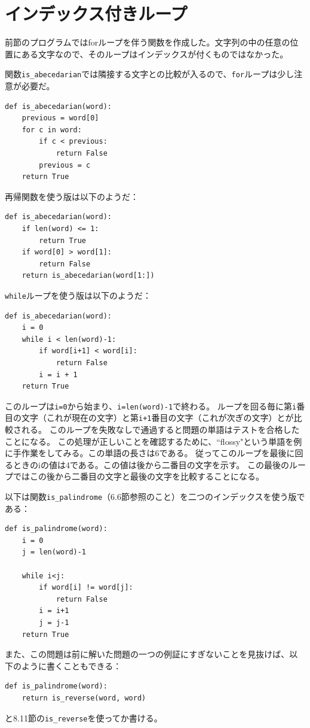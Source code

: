 \documentclass[a4j,12pt,makeidx]{jbook}
\begin{document}
\section{インデックス付きループ}
前節のプログラムではforループを伴う関数を作成した。文字列の中の任意の位置にある文字なので、そのループはインデックスが付くものではなかった。 \par
関数{\tt is\_abecedarian}では隣接する文字との比較が入るので、{\tt for}ループは少し注意が必要だ。
\begin{verbatim}
def is_abecedarian(word):
    previous = word[0]
    for c in word:
        if c < previous:
            return False
        previous = c
    return True
\end{verbatim} 
再帰関数を使う版は以下のようだ：
\begin{verbatim}
def is_abecedarian(word):
    if len(word) <= 1:
        return True
    if word[0] > word[1]:
        return False
    return is_abecedarian(word[1:])
\end{verbatim} 
{\tt while}ループを使う版は以下のようだ：
\begin{verbatim}
def is_abecedarian(word):
    i = 0
    while i < len(word)-1:
        if word[i+1] < word[i]:
            return False
        i = i + 1
    return True
\end{verbatim} 
このループは{\tt i=0}から始まり、{\tt i=len(word)-1}で終わる。
ループを回る毎に第{\tt i}番目の文字（これが現在の文字）と第{\tt i+1}番目の文字（これが次ぎの文字）とが比較される。
このループを失敗なしで通過すると問題の単語はテストを合格したことになる。
この処理が正しいことを確認するために、``flossy"という単語を例に手作業をしてみる。この単語の長さは6である。
従ってこのループを最後に回るときのiの値は4である。この値は後から二番目の文字を示す。
この最後のループではこの後から二番目の文字と最後の文字を比較することになる。\par
以下は関数{\tt is\_palindrome}（6.6節参照のこと）を二つのインデックスを使う版である：
\begin{verbatim}
def is_palindrome(word):
    i = 0
    j = len(word)-1

    while i<j:
        if word[i] != word[j]:
            return False
        i = i+1
        j = j-1
    return True
\end{verbatim}
また、この問題は前に解いた問題の一つの例証にすぎないことを見抜けば、以下のように書くこともできる：
\begin{verbatim}
def is_palindrome(word):
    return is_reverse(word, word)
\end{verbatim}
と8.11節の{\tt is\_reverse}を使ってか書ける。
%
\end{document}
